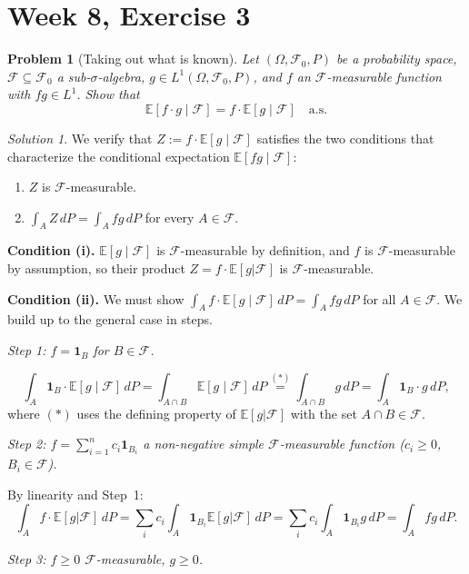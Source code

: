 \documentclass[12pt]{article}
\newtheorem{problem}{Problem}
\theoremstyle{remark}
\newtheorem*{solution}{Solution}
\newcommand{\E}{\mathbb{E}}
\newcommand{\F}{\mathcal{F}}
\newcommand{\1}{\mathbf{1}}
\begin{document}
\section*{Week 8, Exercise 3}

\begin{problem}[Taking out what is known]
\label{prob:ex3}
Let $(\Omega, \F_0, P)$ be a probability space, $\F \subseteq \F_0$ a sub-$\sigma$-algebra,
$g \in L^1(\Omega, \F_0, P)$, and $f$ an $\F$-measurable function with $fg \in L^1$.
Show that
\[
  \E[f \cdot g \mid \F] = f \cdot \E[g \mid \F] \quad \text{a.s.}
\]
\end{problem}

\begin{solution}

We verify that $Z := f \cdot \E[g \mid \F]$ satisfies the two conditions that
characterize the conditional expectation $\E[fg \mid \F]$:
\begin{enumerate}
  \item[(i)] $Z$ is $\F$-measurable.
  \item[(ii)] $\int_A Z\,dP = \int_A fg\,dP$ for every $A \in \F$.
\end{enumerate}

\textbf{Condition (i).}
$\E[g \mid \F]$ is $\F$-measurable by definition, and $f$ is $\F$-measurable by
assumption, so their product $Z = f \cdot \E[g|\F]$ is $\F$-measurable.

\textbf{Condition (ii).}
We must show $\int_A f \cdot \E[g \mid \F]\,dP = \int_A fg\,dP$ for all $A \in \F$.
We build up to the general case in steps.

\medskip
\noindent\textit{Step 1: $f = \1_B$ for $B \in \F$.}

\[
  \int_A \1_B \cdot \E[g \mid \F]\,dP
  = \int_{A \cap B} \E[g \mid \F]\,dP
  \overset{(*)}{=} \int_{A \cap B} g\,dP
  = \int_A \1_B \cdot g\,dP,
\]
where $(*)$ uses the defining property of $\E[g|\F]$ with the set $A \cap B \in \F$.

\medskip
\noindent\textit{Step 2: $f = \sum_{i=1}^n c_i \1_{B_i}$ a non-negative simple
$\F$-measurable function ($c_i \ge 0$, $B_i \in \F$).}

By linearity and Step~1:
\[
  \int_A f \cdot \E[g|\F]\,dP = \sum_i c_i \int_A \1_{B_i}\E[g|\F]\,dP
  = \sum_i c_i \int_A \1_{B_i} g\,dP = \int_A fg\,dP.
\]

\medskip
\noindent\textit{Step 3: $f \ge 0$ $\F$-measurable, $g \ge 0$.}


\end{solution}
\end{document}
